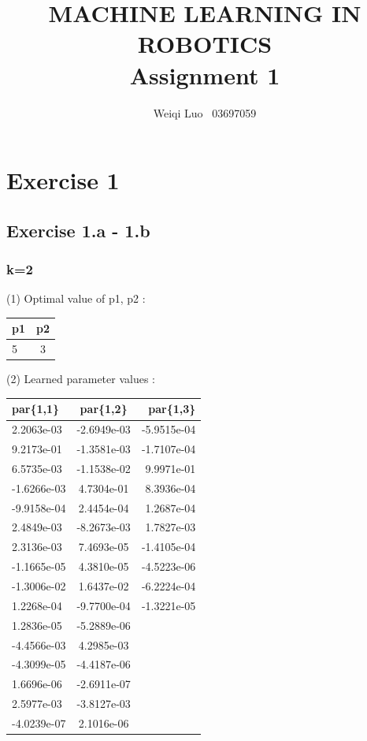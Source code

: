 \documentclass{article}
\begin{document}
\title{MACHINE LEARNING IN ROBOTICS \\ Assignment 1}
\author{Weiqi Luo \ 03697059}

\maketitle
\newpage

\section*{Exercise 1}

\subsection*{Exercise 1.a - 1.b}
\subsubsection*{k=2}
(1) Optimal value of p1, p2 :  \\
\begin{center}
	\begin{tabular}{ l | c }
		\hline
		p1 & p2 \\ \hline		
		5 & 3 \\ \hline
	\end{tabular}
\end{center}
(2) Learned parameter values : \\
\begin{center}
	\begin{tabular}{ l | c | r  }
		\hline
		par\{1,1\}& par\{1,2\} & par\{1,3\} \\
		\hline		
	   2.2063e-03 & -2.6949e-03 & -5.9515e-04 \\ \hline
	   9.2173e-01 & -1.3581e-03 & -1.7107e-04 \\ \hline
	   6.5735e-03 & -1.1538e-02 & 9.9971e-01 \\ \hline
	   -1.6266e-03 & 4.7304e-01 & 8.3936e-04 \\ \hline
	   -9.9158e-04 & 2.4454e-04 & 1.2687e-04 \\ \hline
	   2.4849e-03 & -8.2673e-03 & 1.7827e-03 \\ \hline
	   2.3136e-03 & 7.4693e-05 & -1.4105e-04 \\ \hline
	   -1.1665e-05 & 4.3810e-05 & -4.5223e-06 \\ \hline
	   -1.3006e-02 & 1.6437e-02 & -6.2224e-04 \\ \hline
	   1.2268e-04 & -9.7700e-04 & -1.3221e-05 \\ \hline
	   1.2836e-05 & -5.2889e-06 &  \\ \hline
	   -4.4566e-03 & 4.2985e-03 &  \\ \hline
	   -4.3099e-05 & -4.4187e-06 &  \\ \hline
	   1.6696e-06 & -2.6911e-07 &  \\ \hline
	   2.5977e-03 & -3.8127e-03 &  \\ \hline
	   -4.0239e-07 & 2.1016e-06 &  \\ \hline
	\end{tabular}
\end{center}
\newpage
\end{document}
